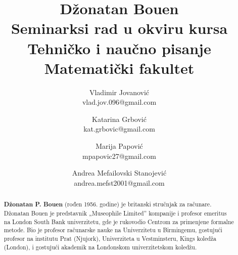 \documentclass[a4paper]{article}
\begin{document}
\title{Džonatan Bouen\\ \small{Seminarksi rad u okviru kursa\\ Tehničko i naučno pisanje\\ Matematički fakultet}}

\author{Vladimir Jovanović\\vlad.jov.096@gmail.com \and Katarina Grbović\\kat.grbovic@gmail.com \and Marija Papović\\mpapovic27@gmail.com\and Andrea Mefailovski Stanojević\\andrea.mefst2001@gmail.com}
\date{}
\maketitle

\begin{abstract}
\textbf{Džonatan P. Bouen} (rođen 1956. godine) je britanski stručnjak za računare.
Džonatan Bouen je predstavnik „Museophile Limited” kompanije i profesor emeritus na London South Bank univerzitetu, gde je rukovodio Centrom za primenjene formalne metode.\cite{btu} Bio je profesor računarske nauke na Univerzitetu u Birmingemu,\cite{ctn} gostujući profesor na institutu Prat (Njujork), Univerziteta u Vestminsteru, Kings koledža (London)\cite{crest}, i gostujući akademik na Londonskom univerzitetskom koledžu.\cite{homepage}
\end{abstract}

\tableofcontents
\newpage
\end{document}
